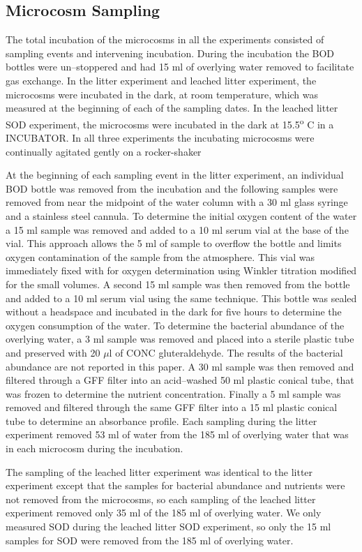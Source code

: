 \subsection{Microcosm Sampling}
The total incubation of the microcosms in all the experiments consisted of sampling events and intervening incubation. During the incubation the BOD bottles were un--stoppered and had 15 ml of overlying water removed to facilitate gas exchange. In the litter experiment and leached litter experiment, the microcosms were incubated in the dark, at room temperature, which was measured at the beginning of each of the sampling dates. In the leached litter SOD experiment, the microcosms were incubated in the dark at 15.5\textsuperscript{o} C in a INCUBATOR. In all three experiments the incubating microcosms were continually agitated gently on a rocker-shaker

At the beginning of each sampling event in the litter experiment, an individual BOD bottle was removed from the incubation and the following samples were removed from near the midpoint of the water column with a 30 ml glass syringe and a stainless steel cannula. To determine the initial oxygen content of the water a 15 ml sample was removed and added to a 10 ml serum vial at the base of the vial. This approach allows the 5 ml of sample to overflow the bottle and limits oxygen contamination of the sample from the atmosphere. This vial was immediately fixed with for oxygen determination using Winkler titration \cite{CARPENTER_1965} modified for the small volumes. A second 15 ml sample was then removed from the bottle and added to a 10 ml serum vial using the same technique. This bottle was sealed without a headspace and incubated in the dark for five hours to determine the oxygen consumption of the water. To determine the bacterial abundance of the overlying water, a 3 ml sample was removed and placed into a sterile plastic tube and preserved with 20 $\mu$l of CONC gluteraldehyde. The results of the bacterial abundance are not reported in this paper. A 30 ml sample was then removed and filtered through a GFF filter into an acid--washed 50 ml plastic conical tube, that was frozen to determine the nutrient concentration. Finally a 5 ml sample was removed and filtered through the same GFF filter into a 15 ml plastic conical tube to determine an absorbance profile. Each sampling during the litter experiment removed 53 ml of water from the 185 ml of overlying water that was in each microcosm during the incubation. 

The sampling of the leached litter experiment was identical to the litter experiment except that the samples for bacterial abundance and nutrients were not removed from the microcosms, so each sampling of the leached litter experiment removed only 35 ml of the 185 ml of overlying water. We only measured SOD during the leached litter SOD experiment, so only the 15 ml samples for SOD were removed from the 185 ml of overlying water.

